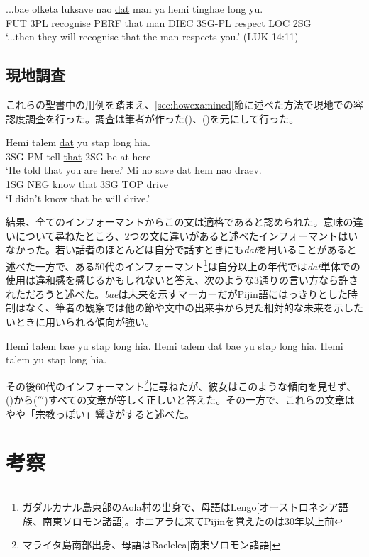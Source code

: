 \begin{exe}
\ex
\gll ...bae olketa luksave nao \underline{dat} man ya hemi tinghae long yu.\\
FUT 3PL recognise PERF \underline{that} man DIEC 3SG-PL respect LOC 2SG\\
\glt `...then they will recognise that the man respects you.' (LUK 14:11)
\end{exe}


\subsection{現地調査}\label{sec:datfield}

これらの聖書中の用例を踏まえ、\ref{sec:howexamined}節に述べた方法で現地での容認度調査を行った。調査は筆者が作った()、()を元にして行った。

\begin{exe}
\ex\label{dat1}
\gll Hemi talem \underline{dat} yu stap long hia.\\
3SG-PM tell \underline{that} 2SG be at here\\
\glt `He told that you are here.'
\ex\label{dat2}
\gll Mi no save \underline{dat} hem nao draev.\\
1SG NEG know \underline{that} 3SG TOP drive\\
\glt `I didn't know that he will drive.'
\end{exe}

結果、全てのインフォーマントからこの文は適格であると認められた。意味の違いについて尋ねたところ、2つの文に違いがあると述べたインフォーマントはいなかった。若い話者のほとんどは自分で話すときにも\textit{dat}を用いることがあると述べた一方で、ある50代のインフォーマント\footnote{ガダルカナル島東部のAola村の出身で、母語はLengo[オーストロネシア語族、南東ソロモン諸語]。ホニアラに来てPijinを覚えたのは30年以上前}は自分以上の年代では\textit{dat}単体での使用は違和感を感じるかもしれないと答え、次のような3通りの言い方なら許されただろうと述べた。\textit{bae}は未来を示すマーカーだがPijin語にはっきりとした時制はなく\citep{eric}、筆者の観察では他の節や文中の出来事から見た相対的な未来を示したいときに用いられる傾向が強い。

\begin{exe}
 Hemi talem \underline{bae} yu stap long hia.
 Hemi talem \underline{dat} \underline{bae} yu stap long hia.
 Hemi talem yu stap long hia.
\end{exe}

その後60代のインフォーマント\footnote{マライタ島南部出身、母語はBaelelea[南東ソロモン諸語]}に尋ねたが、彼女はこのような傾向を見せず、()から($'''$)すべての文章が等しく正しいと答えた。その一方で、これらの文章はやや「宗教っぽい」響きがすると述べた。

\section{考察}

